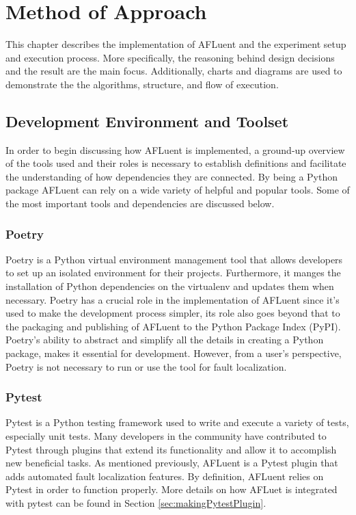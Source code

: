 \chapter{Method of Approach}
\label{ch:method}

This chapter describes the implementation of AFLuent and the experiment setup and
execution process. More specifically, the reasoning behind design decisions and
the result are the main focus. Additionally, charts and diagrams  are used to
demonstrate the the algorithms, structure, and flow of execution.

\section{Development Environment and Toolset}
\label{sec:DevEnviron}

In order to begin discussing how AFLuent is implemented, a ground-up overview of the
tools used and their roles is necessary to establish definitions and facilitate
the understanding of how dependencies they are connected. By being a Python
package AFLuent can rely on a wide variety of helpful and popular
tools. Some of the most important tools and dependencies are discussed below.

\subsection{Poetry}
\label{subsec:poetry}

Poetry is a Python virtual environment management tool that allows developers to
set up an isolated environment for their projects. Furthermore, it manges the
installation of Python dependencies on the virtualenv and updates them when
necessary. Poetry has a crucial role in the implementation of AFLuent since it's
used to make the development process simpler, its role also goes beyond
that to the packaging and publishing of AFLuent to the Python Package Index
(PyPI). Poetry's ability to abstract and simplify all the details in creating a
Python package, makes it essential for development. However, from a user's
perspective, Poetry is not necessary to run or use the tool for fault localization.

\subsection{Pytest}
\label{subsec:pytest}

Pytest is a Python testing framework used to write and execute a variety of
tests, especially unit tests. Many developers in the community have contributed
to Pytest through plugins that extend its functionality and allow it to
accomplish new beneficial tasks. As mentioned previously, AFLuent is a Pytest
plugin that adds automated fault localization features. By definition, AFLuent
relies on Pytest in order to function properly. More details on how AFLuet is
integrated with pytest can be found in Section \ref{sec:makingPytestPlugin}.

